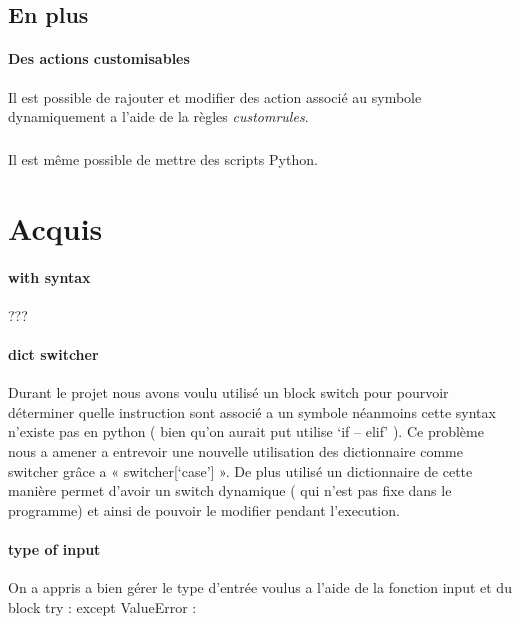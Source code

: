 \documentclass{report}
\begin{document}
		\subsection{En plus}
				\paragraph{Des actions customisables}
					Il est possible de rajouter et modifier des action associé au symbole dynamiquement a l'aide de la règles \emph{customrules}.

				\subparagraph{}
					Il est même possible de mettre des scripts Python.

	\section{Acquis}
		\paragraph{with syntax} ???
		\paragraph{dict switcher}
			Durant le projet nous avons voulu utilisé un block switch pour pourvoir déterminer quelle instruction sont associé a un symbole néanmoins cette syntax n’existe pas en python ( bien qu’on aurait put utilise ‘if – elif’ ). Ce problème nous a amener a entrevoir une nouvelle utilisation des dictionnaire comme switcher grâce a « switcher[‘case’] ». De plus utilisé un dictionnaire de cette manière permet d’avoir un switch dynamique ( qui n’est pas fixe dans le programme) et ainsi de pouvoir le modifier pendant l’execution.
		\paragraph{type of input}
			On a appris a bien gérer le type d’entrée voulus a l’aide de la fonction input et du block try : except ValueError :
\end{document}
